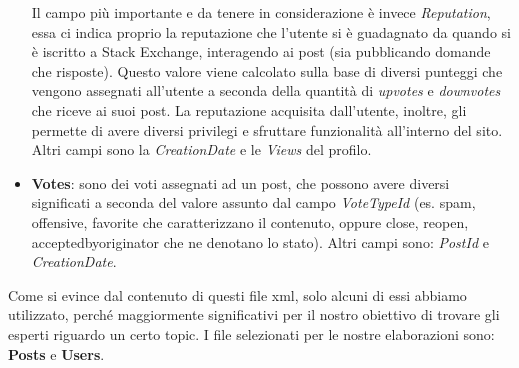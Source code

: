 \begin{itemize}
    Il campo più importante e da tenere in considerazione è invece \textit{Reputation}, essa ci indica proprio la reputazione che l'utente si è guadagnato da quando si è iscritto a Stack Exchange, interagendo ai post (sia pubblicando domande che risposte). Questo valore viene calcolato sulla base di diversi punteggi che vengono assegnati all'utente a seconda della quantità di \textit{upvotes} e \textit{downvotes} che riceve ai suoi post. La reputazione acquisita dall'utente, inoltre, gli permette di avere diversi privilegi e sfruttare funzionalità all'interno del sito. Altri campi sono la \textit{CreationDate} e le \textit{Views} del profilo. 
    \item \textbf{Votes}: sono dei voti assegnati ad un post, che possono avere diversi significati a seconda del valore assunto dal campo \textit{VoteTypeId} (es. spam, offensive, favorite che caratterizzano il contenuto, oppure close, reopen, acceptedbyoriginator che ne denotano lo stato). Altri campi sono: \textit{PostId} e \textit{CreationDate}.
\end{itemize}
\vspace{1cm}
Come si evince dal contenuto di questi file xml, solo alcuni di essi abbiamo utilizzato, perché maggiormente significativi per il nostro obiettivo di trovare gli esperti riguardo un certo topic. I file selezionati per le nostre elaborazioni sono: \textbf{Posts} e \textbf{Users}.